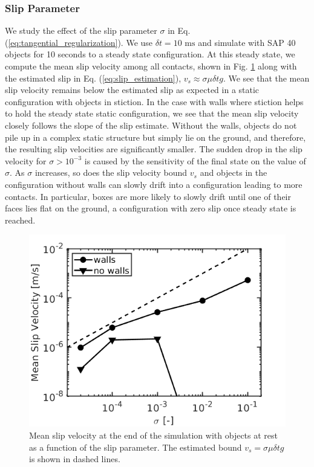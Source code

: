 \subsubsection{Slip Parameter}
We study the effect of the slip parameter $\sigma$ in Eq.
(\ref{eq:tangential_regularization}). We use $\delta t = 10\text{ ms}$ and
simulate with SAP 40 objects for 10 seconds to a steady state configuration. At this
steady state, we compute the mean slip velocity
among all contacts, shown in Fig. \ref{fig:clutter_sigma_vt} along with the estimated slip in Eq. (\ref{eq:slip_estimation}), $v_s
\approx\sigma\mu\delta t g$. We see that the mean slip
velocity remains below the estimated slip as expected in a static configuration
with objects in stiction. In the case with walls where stiction helps to hold
the steady state static configuration, we see that the mean slip velocity
closely follows the slope of the slip estimate. Without the walls, objects do
not pile up in a complex static structure but simply lie on the ground, and
therefore, the resulting slip velocities are significantly smaller. The sudden
drop in the slip velocity for $\sigma>10^{-3}$ is caused by the sensitivity of
the final state on the value of $\sigma$. As $\sigma$ increases, so does the
slip velocity bound $v_s$ and objects in the configuration without walls can
slowly drift into a configuration leading to more contacts. In particular, boxes
are more likely to slowly drift until one of their faces lies flat
on the ground, a configuration with zero slip once steady state is reached.
\begin{figure}[!h]
	\centering
	\includegraphics[width=0.7\columnwidth]{figures/clutter/sigma_vt.png}
	\caption{\label{fig:clutter_sigma_vt} 
	Mean slip velocity at the end of the simulation with objects at rest as a
	function of the slip parameter. The estimated bound $v_s = \sigma\mu\delta t g$ is shown in dashed lines.}
\end{figure}

